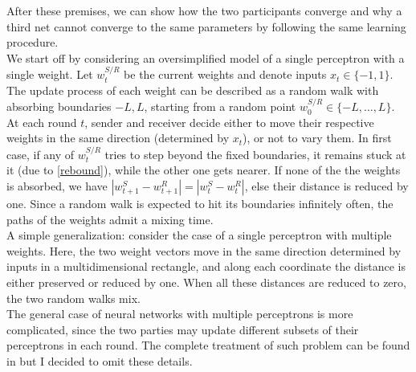 \documentclass[%
    corpo=11pt,
    twoside,
    stile=classica,
    oldstyle,
    autoretitolo,
    tipotesi=magistrale,
    greek,
    evenboxes,
    english
]{toptesi}
\begin{document}
After these premises, we can show how the two participants converge and why a third net cannot converge to the same parameters by following the same learning procedure. \\
 We start off by considering an oversimplified model of a single perceptron with a single weight. \iftrue Let $w^{S/R}_{t}$  be the current weights and denote inputs $x_{t} \in \{-1,1\} $. \fi The update process of each weight can be described as a random walk with absorbing boundaries $-L,L$, starting from a random point $w^{S/R}_{0}\in\{-L,\dots ,L\}$. \\
At each round $t$, sender and receiver decide either to move their respective weights in the same direction (determined by $x_t$), or not to vary them. In first case, if any of $w^{S/R}_t$ tries to step beyond the fixed boundaries, it remains stuck at it (due to \eqref{rebound}), while the other one gets nearer.  If none of the the weights is absorbed, we have $|w_{t+1}^S - w_{t+1}^R| = |w_{t}^S - w_{t}^R|$, else their distance is reduced by one. Since a random walk is expected to hit its boundaries infinitely often, the paths of the weights admit a mixing time. \\
A simple generalization: consider the case of a single perceptron with multiple weights. Here, the two weight vectors move in the same direction determined by inputs in a multidimensional rectangle, and along each coordinate the distance is either preserved or reduced by one. When all these distances are reduced to zero, the two random walks mix. \\
The general case of neural networks with multiple perceptrons is more complicated, since the two parties may update different subsets of their perceptrons in each round. The complete treatment of such problem can be found in \cite{shamir} but I decided to omit these details.
\end{document}

